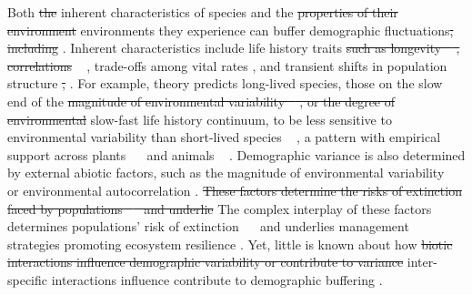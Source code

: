 \documentclass[lineno,sn-nature]{sn-jnl}%
\providecommand{\DIFadd}[1]{{\protect\color{blue}#1}} %
\providecommand{\DIFdel}[1]{{\protect\color{red}\protect\scriptsize\sout{#1}}}
\providecommand{\DIFadd}[1]{{\protect\color{blue}\uwave{#1}}} %
\providecommand{\DIFdel}[1]{{\protect\color{red}\sout{#1}}}                      %
\providecommand{\DIFaddbegin}{} %
\providecommand{\DIFaddend}{} %
\providecommand{\DIFdelbegin}{} %
\providecommand{\DIFdelend}{} %
\newcommand{\DIFscaledelfig}{0.5}
\newlength{\DIFdelgraphicswidth} %
\newlength{\DIFdelgraphicsheight} %
\newcommand{\DIFaddincludegraphics}[2][]{{\color{blue}\fbox{\DIFOincludegraphics[#1]{#2}}}} %
\newcommand{\DIFdelincludegraphics}[2][]{%
\sbox{\DIFdelgraphicsbox}{\DIFOincludegraphics[#1]{#2}}%
\settoboxwidth{\DIFdelgraphicswidth}{\DIFdelgraphicsbox} %
\settoboxtotalheight{\DIFdelgraphicsheight}{\DIFdelgraphicsbox} %
\scalebox{\DIFscaledelfig}{%
\parbox[b]{\DIFdelgraphicswidth}{\usebox{\DIFdelgraphicsbox}\\[-\baselineskip] \rule{\DIFdelgraphicswidth}{0em}}\llap{\resizebox{\DIFdelgraphicswidth}{\DIFdelgraphicsheight}{%
\setlength{\unitlength}{\DIFdelgraphicswidth}%
\begin{picture}(1,1)%
\thicklines\linethickness{2pt} %
{\color[rgb]{1,0,0}\put(0,0){\framebox(1,1){}}}%
{\color[rgb]{1,0,0}\put(0,0){\line( 1,1){1}}}%
{\color[rgb]{1,0,0}\put(0,1){\line(1,-1){1}}}%
\end{picture}%
}\hspace*{3pt}}} %
} %
\DeclareRobustCommand{\DIFaddbegin}{\DIFOaddbegin \let\includegraphics\DIFaddincludegraphics} %
\DeclareRobustCommand{\DIFaddend}{\DIFOaddend \let\includegraphics\DIFOincludegraphics} %
\DeclareRobustCommand{\DIFdelbegin}{\DIFOdelbegin \let\includegraphics\DIFdelincludegraphics} %
\DeclareRobustCommand{\DIFdelend}{\DIFOaddend \let\includegraphics\DIFOincludegraphics} %
\begin{document}
Both \DIFdelbegin \DIFdel{the }\DIFdelend \DIFaddbegin \DIFadd{inherent }\DIFaddend characteristics of species and the \DIFdelbegin \DIFdel{properties of their environment }\DIFdelend \DIFaddbegin \DIFadd{environments they experience }\DIFaddend can buffer demographic fluctuations\DIFdelbegin \DIFdel{, including }\DIFdelend \DIFaddbegin \DIFadd{. 
Inherent characteristics include }\DIFaddend life history traits \DIFdelbegin \DIFdel{such as longevity \mbox{%
\cite{pfister1998patterns, morris2008longevity}}\hspace{0pt}%
, correlations }\DIFdelend \DIFaddbegin \DIFadd{\mbox{%
\cite{pfister1998patterns}}\hspace{0pt}%
, trade-offs }\DIFaddend among vital rates \cite{compagnoni2016effect}, \DIFaddbegin \DIFadd{and }\DIFaddend transient shifts in population structure \cite{ellis2013role}\DIFdelbegin \DIFdel{, }\DIFdelend \DIFaddbegin \DIFadd{. 
For example, theory predicts long-lived species, those on the slow end of }\DIFaddend the \DIFdelbegin \DIFdel{magnitude of environmental variability \mbox{%
\cite{rodriguez2021limits}}\hspace{0pt}%
, or the degree of environmental }\DIFdelend \DIFaddbegin \DIFadd{slow-fast life history continuum, to be less sensitive to environmental variability than short-lived species \mbox{%
\cite{murphy1968pattern}}\hspace{0pt}%
, a pattern with empirical support across plants \mbox{%
\cite{davison2019stochastic,compagnoni2021herbaceous} }\hspace{0pt}%
and animals \mbox{%
\cite{le2022life,morris2008longevity}}\hspace{0pt}%
.
Demographic variance is also determined by external abiotic factors, such as the magnitude of environmental variability \mbox{%
\cite{rodriguez2021limits} }\hspace{0pt}%
or environmental }\DIFaddend autocorrelation \cite{tuljapurkar1980population,fieberg2001stochastic}.
\DIFdelbegin \DIFdel{These factors determine the risks of extinction faced by populations \mbox{%
\cite{menges2000applications} }\hspace{0pt}%
and underlie }\DIFdelend \DIFaddbegin \DIFadd{The complex interplay of these factors determines populations' risk of extinction \mbox{%
\cite{menges2000applications} }\hspace{0pt}%
and underlies }\DIFaddend management strategies promoting ecosystem resilience \cite{kuparinen2016fishing}. 
Yet\DIFaddbegin \DIFadd{, }\DIFaddend little is known about how \DIFdelbegin \DIFdel{biotic interactions influence demographic variability or contribute to variance }\DIFdelend \DIFaddbegin \DIFadd{inter-specific interactions influence contribute to demographic }\DIFaddend buffering \cite{hilde_demographic_2020}. 
\end{document}
